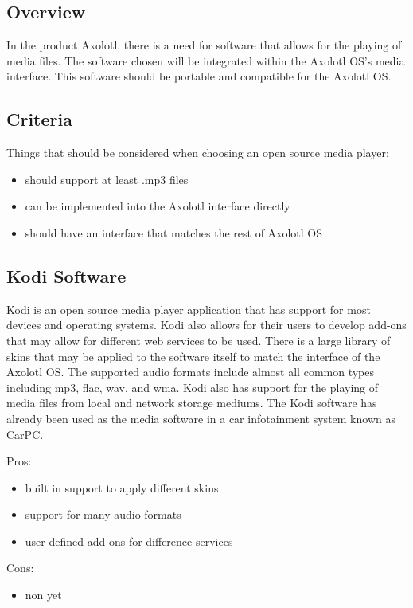 \documentclass[onecolumn, draftclsnofoot,10pt, compsoc]{IEEEtran}
\begin{document}
\subsection{Overview}
In the product Axolotl, there is a need for software that allows for the playing of media files. The software chosen will be integrated within the Axolotl OS's media interface. This software should be portable and compatible for the Axolotl OS.

\subsection{Criteria}
Things that should be considered when choosing an open source media player:
\begin{itemize}
    \item should support at least .mp3 files
    \item can be implemented into the Axolotl interface directly
    \item should have an interface that matches the rest of Axolotl OS
\end{itemize}

\subsection{Kodi Software}
Kodi is an open source media player application that has support for most devices and operating systems. Kodi also allows for their users to develop add-ons that may allow for different web services to be used. There is a large library of skins that may be applied to the software itself to match the interface of the Axolotl OS. The supported audio formats include almost all common types including mp3, flac, wav, and wma. Kodi also has support for the playing of media files from local and network storage mediums. The Kodi software has already been used as the media software in a car infotainment system known as CarPC. ~\cite{kodi:features}

Pros:
\begin{itemize}
    \item built in support to apply different skins
    \item support for many audio formats
    \item user defined add ons for difference services
\end{itemize}

Cons:
\begin{itemize}
    \item non yet
\end{itemize}
\end{document}
